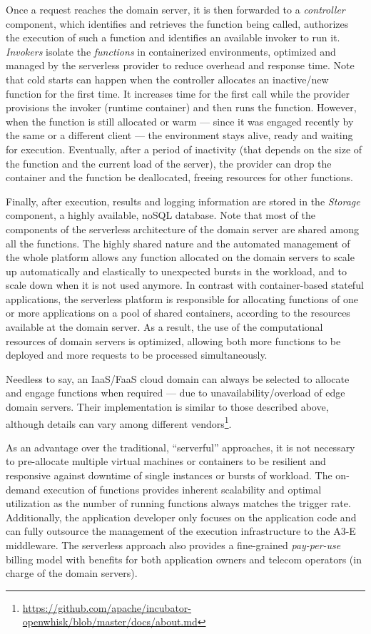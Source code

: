 Once a request reaches the domain server, it is then forwarded to a \textit{controller} component, which identifies and retrieves the function being called, authorizes the execution of such a function and identifies an available invoker to run it. \textit{Invokers} isolate the \textit{functions} in containerized environments, optimized and managed by the serverless provider to reduce overhead and response time. Note that cold starts can happen when the controller allocates an inactive/new function for the first time. It increases time for the first call while the provider provisions the invoker (runtime container) and then runs the function. However, when the function is still allocated or warm --- since it was engaged recently by the same or a different client --- the environment stays alive, ready and waiting for execution. Eventually, after a period of inactivity (that depends on the size of the function and the current load of the server), the provider can drop the container and the function be deallocated, freeing resources for other functions.


Finally, after execution, results and logging information are stored in the \textit{Storage} component, a highly available, noSQL database. Note that most of the components of the serverless architecture of the domain server are shared 
among all the functions. The highly shared nature and the automated management of the whole platform allows any function allocated on the domain servers to scale up automatically and elastically to unexpected bursts in the workload, and to scale down when it is not used anymore. In contrast with container-based stateful applications, the serverless platform is responsible for allocating functions of one or more applications on a pool of shared containers, according to the resources available at the domain server. As a result, the use of the computational resources of domain servers is optimized, allowing both more functions to be deployed and more requests to be processed simultaneously.

Needless to say, an IaaS/FaaS cloud domain can always be selected to allocate and engage functions when required --- due to unavailability/overload of edge domain servers. Their implementation is similar to those described above, although details can vary among different vendors\footnote{\url{https://github.com/apache/incubator-openwhisk/blob/master/docs/about.md}}.

As an advantage over the traditional, ``serverful'' approaches, it is not necessary to pre-allocate multiple virtual machines or containers to be resilient and responsive against downtime of single instances or bursts of workload. The on-demand execution of functions provides inherent scalability and optimal utilization as the number of running functions always matches the trigger rate. Additionally, the application developer only focuses on the application code and can fully outsource the management of the execution infrastructure to the A3-E middleware. The serverless approach also provides a fine-grained \textit{pay-per-use} billing model with benefits for both application owners and telecom operators (in charge of the domain servers).



